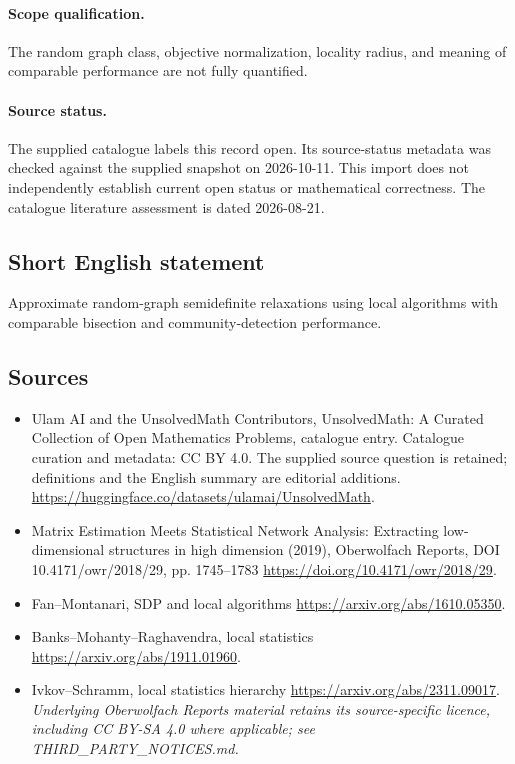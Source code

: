 \documentclass[11pt]{article}
\begin{document}
\paragraph{Scope qualification.}
The random graph class, objective normalization, locality radius, and meaning of comparable performance are not fully quantified.
\paragraph{Source status.}
The supplied catalogue labels this record open. Its source-status metadata was checked against the supplied snapshot on 2026-10-11. This import does not independently establish current open status or mathematical correctness. The catalogue literature assessment is dated 2026-08-21.
\subsection{Short English statement}
Approximate random-graph semidefinite relaxations using local algorithms with comparable bisection and community-detection performance.
\subsection{Sources}
\begin{itemize}
\item[S1] Ulam AI and the UnsolvedMath Contributors, UnsolvedMath: A Curated Collection of Open Mathematics Problems, catalogue entry. Catalogue curation and metadata: CC BY 4.0. The supplied source question is retained; definitions and the English summary are editorial additions.
\url{https://huggingface.co/datasets/ulamai/UnsolvedMath}.
\item[S2] Matrix Estimation Meets Statistical Network Analysis: Extracting low-dimensional structures in high dimension (2019), Oberwolfach Reports, DOI 10.4171/owr/2018/29, pp. 1745--1783
\url{https://doi.org/10.4171/owr/2018/29}.
\item[S3] Fan--Montanari, SDP and local algorithms
\url{https://arxiv.org/abs/1610.05350}.
\item[S4] Banks--Mohanty--Raghavendra, local statistics
\url{https://arxiv.org/abs/1911.01960}.
\item[S5] Ivkov--Schramm, local statistics hierarchy
\url{https://arxiv.org/abs/2311.09017}.
\textit{Underlying Oberwolfach Reports material retains its source-specific licence, including CC BY-SA 4.0 where applicable; see THIRD\_PARTY\_NOTICES.md.}
\end{itemize}
\end{document}
